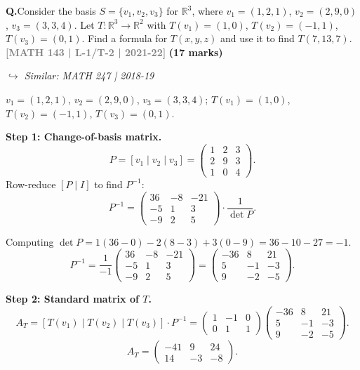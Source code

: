 \documentclass[12pt,a3paper]{article}
\newcommand{\yr}[1]{\hfill\textcolor{gray}{\small\textbf{[#1]}}}
\newcommand{\mk}[1]{\textcolor{orange!70!black}{\small\textbf{(#1 marks)}}}
\newcommand{\variant}[1]{\par\vspace{1pt}\textcolor{blue!50!black}%
  {\footnotesize\textit{$\hookrightarrow$ Similar: #1}}}
\newcounter{qnum}
\newcommand{\Q}[1]{%
  \needspace{4\baselineskip}
  \refstepcounter{qnum}
  \vspace{6pt}
  \noindent\textbf{Q\theqnum.}\enspace #1\par
}
\begin{document}
\Q{Consider the basis $S = \{v_1, v_2, v_3\}$ for $\mathbb{R}^3$, where $v_1 = (1,2,1)$, $v_2 = (2,9,0)$, $v_3 = (3,3,4)$. Let $T: \mathbb{R}^3 \to \mathbb{R}^2$ with $T(v_1) = (1,0)$, $T(v_2) = (-1,1)$, $T(v_3) = (0,1)$. Find a formula for $T(x,y,z)$ and use it to find $T(7,13,7)$.
\yr{MATH 143 | L-1/T-2 | 2021-22} \mk{17}
\variant{MATH 247 | 2018-19}}


\begin{tcolorbox}[enhanced,breakable,
  colback=cF!4,colframe=cF,boxrule=0.8pt,arc=5pt,
  title={\textbf{Answer --- $T:\mathbb{R}^3\to\mathbb{R}^2$ from Basis Values; $T(7,13,7)$}},
  fonttitle=\bfseries\color{white},colbacktitle=cF]

$v_1=(1,2,1)$, $v_2=(2,9,0)$, $v_3=(3,3,4)$; $T(v_1)=(1,0)$, $T(v_2)=(-1,1)$, $T(v_3)=(0,1)$.

\textbf{Step 1: Change-of-basis matrix.}
\[
P=[v_1\mid v_2\mid v_3]=\begin{pmatrix}1&2&3\\2&9&3\\1&0&4\end{pmatrix}.
\]
Row-reduce $[P\mid I]$ to find $P^{-1}$:
\[
P^{-1}=\begin{pmatrix}36&-8&-21\\-5&1&3\\-9&2&5\end{pmatrix}\cdot\frac{1}{\det P}.
\]

Computing $\det P=1(36-0)-2(8-3)+3(0-9)=36-10-27=-1$.
\[
P^{-1}=\frac{1}{-1}\begin{pmatrix}36&-8&-21\\-5&1&3\\-9&2&5\end{pmatrix}=\begin{pmatrix}-36&8&21\\5&-1&-3\\9&-2&-5\end{pmatrix}.
\]

\textbf{Step 2: Standard matrix of $T$.}
\[
A_T=[T(v_1)\mid T(v_2)\mid T(v_3)]\cdot P^{-1}=\begin{pmatrix}1&-1&0\\0&1&1\end{pmatrix}\begin{pmatrix}-36&8&21\\5&-1&-3\\9&-2&-5\end{pmatrix}.
\]
\[
A_T=\begin{pmatrix}-41&9&24\\14&-3&-8\end{pmatrix}.
\]


\end{tcolorbox}
\end{document}

